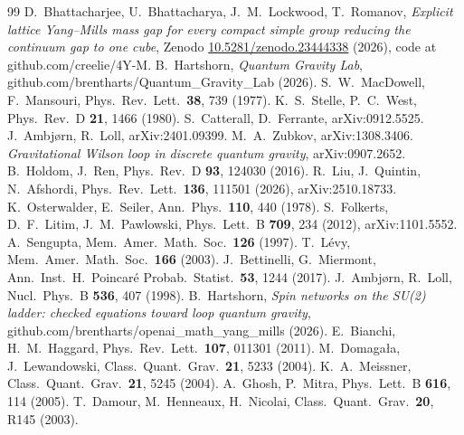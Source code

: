 \documentclass[aps,prd,twocolumn,superscriptaddress,nofootinbib]{revtex4-2}
\theoremstyle{remark}
\begin{document}
\begin{thebibliography}{99}
 D.~Bhattacharjee, U.~Bhattacharya, J.~M.~Lockwood, T.~Romanov, \emph{Explicit lattice Yang--Mills mass
gap for every compact simple group reducing the continuum gap to one cube}, Zenodo
\href{https://doi.org/10.5281/zenodo.23444338}{10.5281/zenodo.23444338} (2026), code at github.com/creelie/4Y-M.
 B.~Hartshorn, \emph{Quantum Gravity Lab}, github.com/brentharts/Quantum\_Gravity\_Lab (2026).
 S.~W.~MacDowell, F.~Mansouri, Phys.\ Rev.\ Lett.\ \textbf{38}, 739 (1977).
 K.~S.~Stelle, P.~C.~West, Phys.\ Rev.\ D \textbf{21}, 1466 (1980).
 S.~Catterall, D.~Ferrante, arXiv:0912.5525.
 J.~Ambj\o rn, R.~Loll, arXiv:2401.09399.
 M.~A.~Zubkov, arXiv:1308.3406.
 \emph{Gravitational Wilson loop in discrete quantum gravity}, arXiv:0907.2652.
 B.~Holdom, J.~Ren, Phys.\ Rev.\ D \textbf{93}, 124030 (2016).
 R.~Liu, J.~Quintin, N.~Afshordi, Phys.\ Rev.\ Lett.\ \textbf{136}, 111501 (2026), arXiv:2510.18733.
 K.~Osterwalder, E.~Seiler, Ann.\ Phys.\ \textbf{110}, 440 (1978).
 S.~Folkerts, D.~F.~Litim, J.~M.~Pawlowski, Phys.\ Lett.\ B \textbf{709}, 234 (2012), arXiv:1101.5552.
 A.~Sengupta, Mem.\ Amer.\ Math.\ Soc.\ \textbf{126} (1997).
 T.~L\'evy, Mem.\ Amer.\ Math.\ Soc.\ \textbf{166} (2003).
 J.~Bettinelli, G.~Miermont, Ann.\ Inst.\ H.\ Poincar\'e Probab.\ Statist.\ \textbf{53}, 1244 (2017).
 J.~Ambj\o rn, R.~Loll, Nucl.\ Phys.\ B \textbf{536}, 407 (1998).
 B.~Hartshorn, \emph{Spin networks on the SU(2) ladder: checked equations toward loop quantum
gravity}, github.com/brentharts/openai\_math\_yang\_mills (2026).
 E.~Bianchi, H.~M.~Haggard, Phys.\ Rev.\ Lett.\ \textbf{107}, 011301 (2011).
 M.~Domaga\l a, J.~Lewandowski, Class.\ Quant.\ Grav.\ \textbf{21}, 5233 (2004).
 K.~A.~Meissner, Class.\ Quant.\ Grav.\ \textbf{21}, 5245 (2004).
 A.~Ghosh, P.~Mitra, Phys.\ Lett.\ B \textbf{616}, 114 (2005).
 T.~Damour, M.~Henneaux, H.~Nicolai, Class.\ Quant.\ Grav.\ \textbf{20}, R145 (2003).
\end{thebibliography}
\end{document}
